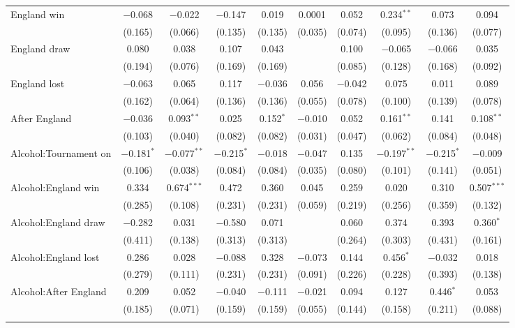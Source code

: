 \documentclass[12pt, a4paper]{article}
\begin{document}
\begin{sidewaystable}
{\begin{threeparttable}
\begin{tabular}{@{\extracolsep{5pt}}lccccccccc}
  England win & $-$0.068 & $-$0.022 & $-$0.147 & 0.019 & 0.0001 & 0.052 & 0.234$^{**}$ & 0.073 & 0.094 \\ 
  & (0.165) & (0.066) & (0.135) & (0.135) & (0.035) & (0.074) & (0.095) & (0.136) & (0.077) \\ 
  England draw & 0.080 & 0.038 & 0.107 & 0.043 &  & 0.100 & $-$0.065 & $-$0.066 & 0.035 \\ 
  & (0.194) & (0.076) & (0.169) & (0.169) &  & (0.085) & (0.128) & (0.168) & (0.092) \\ 
  England lost & $-$0.063 & 0.065 & 0.117 & $-$0.036 & 0.056 & $-$0.042 & 0.075 & 0.011 & 0.089 \\ 
  & (0.162) & (0.064) & (0.136) & (0.136) & (0.055) & (0.078) & (0.100) & (0.139) & (0.078) \\ 
  After England & $-$0.036 & 0.093$^{**}$ & 0.025 & 0.152$^{*}$ & $-$0.010 & 0.052 & 0.161$^{**}$ & 0.141 & 0.108$^{**}$ \\ 
  & (0.103) & (0.040) & (0.082) & (0.082) & (0.031) & (0.047) & (0.062) & (0.084) & (0.048) \\ 
  Alcohol:Tournament on & $-$0.181$^{*}$ & $-$0.077$^{**}$ & $-$0.215$^{*}$ & $-$0.018 & $-$0.047 & 0.135 & $-$0.197$^{**}$ & $-$0.215$^{*}$ & $-$0.009 \\ 
  & (0.106) & (0.038) & (0.084) & (0.084) & (0.035) & (0.080) & (0.101) & (0.141) & (0.051) \\ 
  Alcohol:England win & 0.334 & 0.674$^{***}$ & 0.472 & 0.360 & 0.045 & 0.259 & 0.020 & 0.310 & 0.507$^{***}$ \\ 
  & (0.285) & (0.108) & (0.231) & (0.231) & (0.059) & (0.219) & (0.256) & (0.359) & (0.132) \\ 
  Alcohol:England draw & $-$0.282 & 0.031 & $-$0.580 & 0.071 &  & 0.060 & 0.374 & 0.393 & 0.360$^{*}$ \\ 
  & (0.411) & (0.138) & (0.313) & (0.313) &  & (0.264) & (0.303) & (0.431) & (0.161) \\ 
  Alcohol:England lost & 0.286 & 0.028 & $-$0.088 & 0.328 & $-$0.073 & 0.144 & 0.456$^{*}$ & $-$0.032 & 0.018 \\ 
  & (0.279) & (0.111) & (0.231) & (0.231) & (0.091) & (0.226) & (0.228) & (0.393) & (0.138) \\ 
  Alcohol:After England & 0.209 & 0.052 & $-$0.040 & $-$0.111 & $-$0.021 & 0.094 & 0.127 & 0.446$^{*}$ & 0.053 \\ 
  & (0.185) & (0.071) & (0.159) & (0.159) & (0.055) & (0.144) & (0.158) & (0.211) & (0.088) \\ 
 \hline \\[-1.8ex] 

\end{tabular}
\end{threeparttable}}
\end{sidewaystable}
\end{document}
